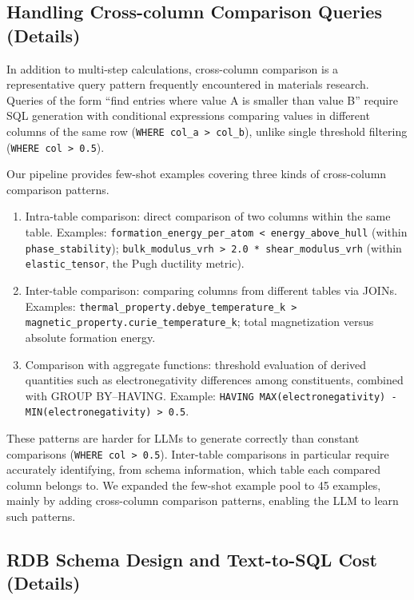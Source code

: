 \subsection{Handling Cross-column Comparison Queries (Details)}

In addition to multi-step calculations, cross-column comparison is a representative query pattern frequently encountered in materials research. Queries of the form ``find entries where value A is smaller than value B'' require SQL generation with conditional expressions comparing values in different columns of the same row (\texttt{WHERE col\_a > col\_b}), unlike single threshold filtering (\texttt{WHERE col > 0.5}).

Our pipeline provides few-shot examples covering three kinds of cross-column comparison patterns.
\begin{enumerate}
  \item Intra-table comparison:
    direct comparison of two columns within the same table.
    Examples: \texttt{formation\_energy\_per\_atom < energy\_above\_hull} (within \texttt{phase\_stability});
    \texttt{bulk\_modulus\_vrh > 2.0 * shear\_modulus\_vrh} (within \texttt{elastic\_tensor}, the Pugh ductility metric).
  \item Inter-table comparison:
    comparing columns from different tables via JOINs.
    Examples: \texttt{thermal\_property.debye\_temperature\_k > magnetic\_property.curie\_temperature\_k};
    total magnetization versus absolute formation energy.
  \item Comparison with aggregate functions:
    threshold evaluation of derived quantities such as electronegativity differences among constituents, combined with GROUP BY--HAVING.
    Example: \texttt{HAVING MAX(electronegativity) - MIN(electronegativity) > 0.5}.
\end{enumerate}

These patterns are harder for LLMs to generate correctly than constant comparisons (\texttt{WHERE col > 0.5}). Inter-table comparisons in particular require accurately identifying, from schema information, which table each compared column belongs to. We expanded the few-shot example pool to 45 examples, mainly by adding cross-column comparison patterns, enabling the LLM to learn such patterns.


\subsection{RDB Schema Design and Text-to-SQL Cost (Details)}

